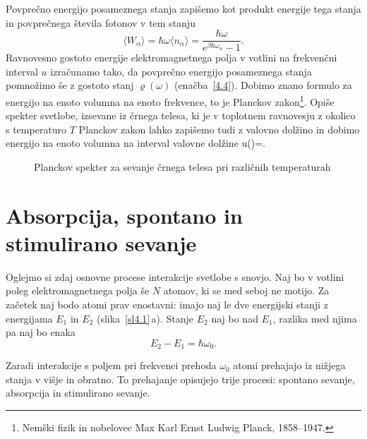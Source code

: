 Povprečno energijo posameznega stanja zapišemo kot produkt energije tega stanja in 
povprečnega števila fotonov v tem stanju
\begin{equation}
\langle W_{\alpha}\rangle = \hbar \omega \langle n_\alpha \rangle
= \frac{\hbar \omega}{e^{\beta\hbar\omega_{\alpha}}-1}.
\end{equation}
Ravnovesno gostoto energije elektromagnetnega polja v votlini na
frekvenčni interval $u$ izračunamo tako, da povprečno energijo posameznega
stanja pomnožimo še z gostoto stanj $\varrho (\omega)$ 
(enačba~\ref{4.4}). Dobimo znano formulo za energijo na enoto volumna na enoto frekvence, 
to je Planckov 
zakon\footnote{Nemški fizik in nobelovec Max Karl Ernst Ludwig Planck, 1858--1947.}.
Opiše spekter svetlobe, izsevane iz črnega telesa, ki je v toplotnem ravnovesju z 
okolico s temperaturo $T$
Planckov zakon lahko zapišemo tudi z valovno dolžino in dobimo energijo na enoto volumna
na interval valovne dolžine
\beq
u(\lambda)=.
\eeq

\begin{figure}[h]
\centering
\def\svgwidth{100truemm} 

\caption{Planckov spekter za sevanje črnega telesa pri različnih temperaturah}
\label{fig:Planck}
\end{figure}

\section{Absorpcija, spontano in stimulirano sevanje}

Oglejmo si zdaj osnovne procese interakcije svetlobe s snovjo. Naj
bo v votlini poleg elektromagnetnega polja še $N$ atomov, ki se med
seboj ne motijo. Za začetek naj bodo atomi prav enostavni:
imajo naj le dve energijski stanji z energijama $E_{1}$ in $E_{2}$ (slika~\ref{sl4.1}\,a). 
Stanje $E_2$ naj bo nad $E_1$, razlika med njima pa naj bo enaka
\begin{equation}
 E_2 - E_1 = \hbar \omega_0.
\end{equation}

Zaradi interakcije s poljem pri frekvenci prehoda $\omega_{0}$
atomi prehajajo iz nižjega stanja v višje in obratno. To prehajanje opisujejo trije procesi: 
spontano sevanje, absorpcija in stimulirano sevanje.

